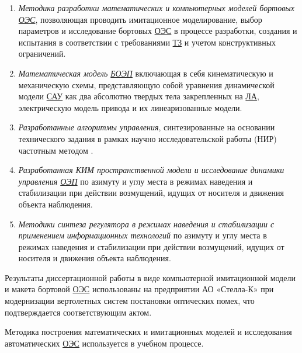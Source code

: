 {}
\begin{enumerate}
  \item \textit{Методика разработки математических и компьютерных моделей бортовых  \hyperref[acroEOS]{ОЭС}}, позволяющая проводить имитационное моделирование, выбор параметров и исследование бортовых  \hyperref[acroEOS]{ОЭС} в процессе разработки, создания и испытания в соответствии с требованиями  \hyperref[acroTZ]{ТЗ} и учетом конструктивных ограничений. 
  \item \textit{Математическая модель  \hyperref[acroAEOS]{БОЭП}} включающая в себя кинематическую и механическую схемы, представляющую собой уравнения динамической модели  \hyperref[acroSAU]{САУ} как два абсолютно твердых тела закрепленных на  \hyperref[acroLA]{ЛА}, электрическую модель привода и их линеаризованные модели.
  \item \textit{Разработанные алгоритмы управления}, синтезированные на основании технического задания в рамках научно исследовательской работы (НИР) частотным методом \cite[]{Babaev}.
  \item \textit{Разработанная КИМ пространственной модели и исследование динамики управления  \hyperref[acroEOS]{ОЭП}} по азимуту и углу места в режимах наведения и стабилизации при действии возмущений, идущих от носителя и движения объекта наблюдения.
  \item \textit{Методики синтеза регулятора в режимах наведения и стабилизации с применением информационных технологий} по азимуту и углу места в режимах наведения и стабилизации при действии возмущений, идущих от носителя и движения объекта наблюдения.
\end{enumerate}
\begin{comment}
{\reliability} \todo{полученных результатов обеспечивается Результаты находятся в соответствии с результатами, полученными другими авторами.}
\end{comment}

{\probation}
Результаты диссертационной работы в виде компьютерной имитационной модели и макета бортовой  \hyperref[acroEOS]{ОЭС} использованы на предприятии АО «Стелла-К» при модернизации вертолетных систем постановки оптических помех, что подтверждается соответствующим актом.

Методика построения математических и имитационных моделей и исследования автоматических  \hyperref[acroEOS]{ОЭС} используется в учебном процессе.
\begin{comment}
{\contribution} \todo{Автор принимал активное участие} \ldots
\end{comment}

